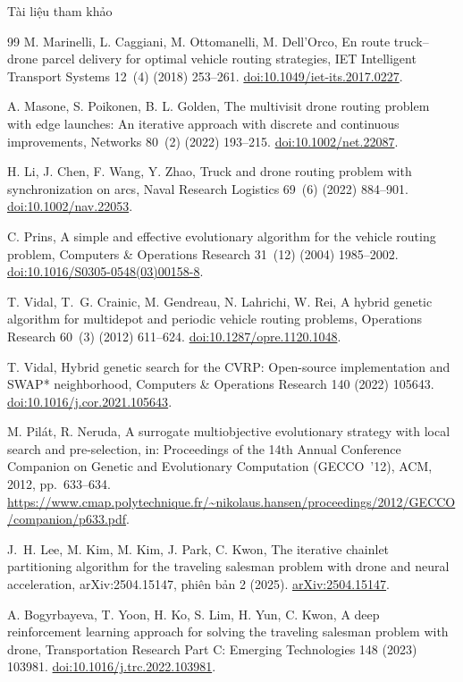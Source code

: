 \documentclass[aspectratio=169,10pt,t,xcolor={table}]{beamer}
\begin{document}
\begin{frame}[allowframebreaks]{Tài liệu tham khảo}
\begin{thebibliography}{99}
M. Marinelli, L. Caggiani, M. Ottomanelli, M. Dell'Orco,
En route truck--drone parcel delivery for optimal vehicle routing strategies,
IET Intelligent Transport Systems 12~(4) (2018) 253--261.
\href{https://doi.org/10.1049/iet-its.2017.0227}{doi:10.1049/iet-its.2017.0227}.

A. Masone, S. Poikonen, B. L. Golden,
The multivisit drone routing problem with edge launches: An iterative approach with discrete and continuous improvements,
Networks 80~(2) (2022) 193--215.
\href{https://doi.org/10.1002/net.22087}{doi:10.1002/net.22087}.

H. Li, J. Chen, F. Wang, Y. Zhao,
Truck and drone routing problem with synchronization on arcs,
Naval Research Logistics 69~(6) (2022) 884--901.
\href{https://doi.org/10.1002/nav.22053}{doi:10.1002/nav.22053}.

C. Prins,
A simple and effective evolutionary algorithm for the vehicle routing problem,
Computers \& Operations Research 31~(12) (2004) 1985--2002.
\href{https://doi.org/10.1016/S0305-0548(03)00158-8}{doi:10.1016/S0305-0548(03)00158-8}.

T. Vidal, T.~G. Crainic, M. Gendreau, N. Lahrichi, W. Rei,
A hybrid genetic algorithm for multidepot and periodic vehicle routing problems,
Operations Research 60~(3) (2012) 611--624.
\href{https://doi.org/10.1287/opre.1120.1048}{doi:10.1287/opre.1120.1048}.

T. Vidal,
Hybrid genetic search for the CVRP: Open-source implementation and SWAP* neighborhood,
Computers \& Operations Research 140 (2022) 105643.
\href{https://doi.org/10.1016/j.cor.2021.105643}{doi:10.1016/j.cor.2021.105643}.

M. Pilát, R. Neruda,
A surrogate multiobjective evolutionary strategy with local search and pre-selection,
in: Proceedings of the 14th Annual Conference Companion on Genetic and Evolutionary Computation (GECCO~'12), ACM, 2012, pp.~633--634.
\url{https://www.cmap.polytechnique.fr/~nikolaus.hansen/proceedings/2012/GECCO/companion/p633.pdf}.

J.~H. Lee, M. Kim, M. Kim, J. Park, C. Kwon,
The iterative chainlet partitioning algorithm for the traveling salesman problem with drone and neural acceleration,
arXiv:2504.15147, phiên bản 2 (2025).
\href{https://arxiv.org/abs/2504.15147}{arXiv:2504.15147}.

A. Bogyrbayeva, T. Yoon, H. Ko, S. Lim, H. Yun, C. Kwon,
A deep reinforcement learning approach for solving the traveling salesman problem with drone,
Transportation Research Part C: Emerging Technologies 148 (2023) 103981.
\href{https://doi.org/10.1016/j.trc.2022.103981}{doi:10.1016/j.trc.2022.103981}.


\end{thebibliography}
\end{frame}
\end{document}
